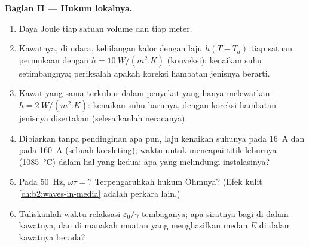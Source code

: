 \begin{problem}
\medskip
\noindent\textbf{Bagian II --- Hukum lokalnya.}
\begin{enumerate}[resume]
  \item Daya Joule tiap satuan volume dan tiap meter.
  \item Kawatnya, di udara, kehilangan kalor dengan laju $h(T - T_a)$ tiap satuan
        permukaan dengan $h = \qty{10}{W/(m^2.K)}$ (konveksi): kenaikan suhu
        setimbangnya; periksalah apakah koreksi hambatan jenisnya
        berarti.
  \item Kawat yang sama terkubur dalam penyekat yang hanya melewatkan $h =
        \qty{2}{W/(m^2.K)}$: kenaikan suhu barunya, dengan koreksi
        hambatan jenisnya disertakan (selesaikanlah neracanya).
  \item Dibiarkan tanpa pendinginan apa pun, laju kenaikan suhunya pada \qty{16}{A}
        dan pada \qty{160}{A} (sebuah korsleting); waktu untuk mencapai titik
        leburnya (\qty{1085}{\degreeCelsius}) dalam hal yang kedua; apa yang melindungi
        instalasinya?
  \item Pada \qty{50}{Hz}, $\omega\tau = ?$ Terpengaruhkah hukum Ohmnya? (Efek
        kulit \cref{ch:b2:waves-in-media} adalah perkara lain.)
  \item Tuliskanlah waktu relaksasi $\varepsilon_0/\gamma$ tembaganya; apa siratnya
        bagi  di dalam kawatnya, dan di manakah
        muatan yang menghasilkan medan $E$ di dalam kawatnya berada?
\end{enumerate}


\end{problem}
